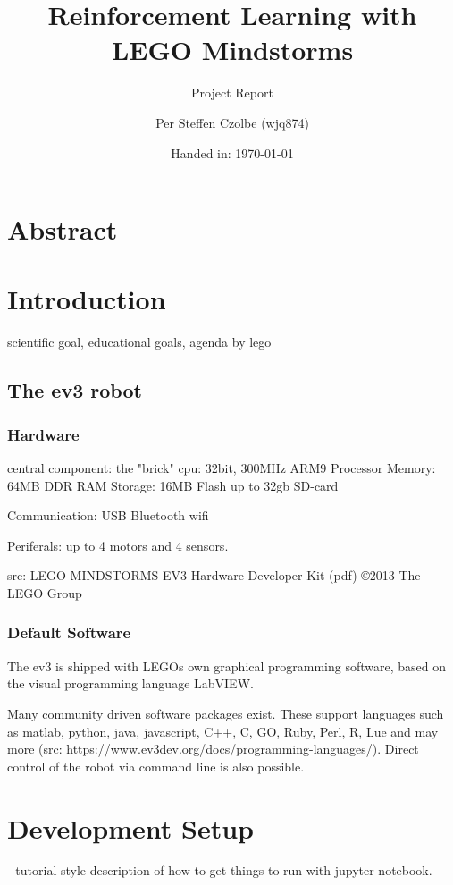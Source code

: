 \documentclass[11pt, a4paper]{article}
\author{Per Steffen Czolbe (wjq874)}
\title{Reinforcement Learning with LEGO Mindstorms}
\subtitle{Project Report}
\date{Handed in: \today}
\begin{document}
\maketitle

\section{Abstract}

\tableofcontents


\section{Introduction}
scientific goal,
educational goals,
agenda by lego

\subsection{The ev3 robot}

\subsubsection{Hardware}
central component: the "brick"
cpu: 32bit, 300MHz ARM9 Processor
Memory: 64MB DDR RAM
Storage: 16MB Flash
up to 32gb SD-card

Communication:
USB
Bluetooth
wifi

Periferals:
up to 4 motors and 4 sensors.

src: LEGO MINDSTORMS EV3 Hardware Developer Kit (pdf) ©2013 The LEGO Group


\subsubsection{Default Software}
The ev3 is shipped with LEGOs own graphical programming software, based on the visual programming language LabVIEW.

Many community driven software packages exist. These support languages such as matlab, python, java, javascript, C++, C, GO, Ruby, Perl, R, Lue and may more (src: https://www.ev3dev.org/docs/programming-languages/). Direct control of the robot via command line is also possible.



\section{Development Setup}
- tutorial style description of how to get things to run with jupyter notebook.
\end{document}
